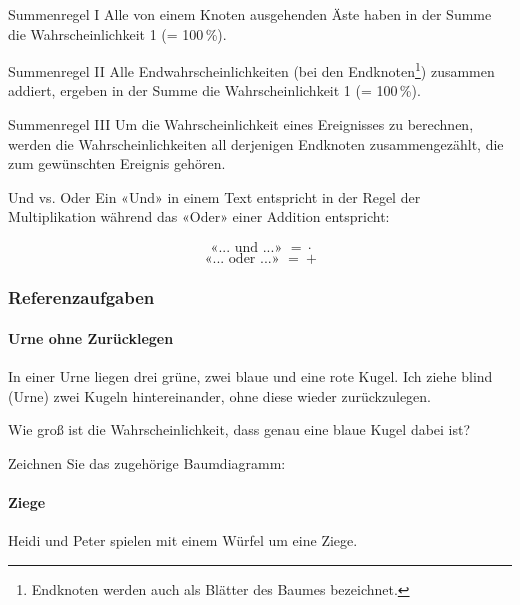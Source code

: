 \leserluft\leserluft
\begin{gesetz}{Summenregel I}{}
Alle von einem Knoten ausgehenden Äste haben in der Summe die Wahrscheinlichkeit 1 (= 100\,\%).
\end{gesetz}

\begin{gesetz}{Summenregel II}{}
Alle Endwahrscheinlichkeiten (bei den Endknoten\footnote{Endknoten werden auch als Blätter des Baumes bezeichnet.}) zusammen addiert, ergeben in der Summe die Wahrscheinlichkeit 1 (= 100\,\%).
\end{gesetz}

\begin{gesetz}{Summenregel III}{}
  Um die Wahrscheinlichkeit eines Ereignisses zu berechnen, werden die
  Wahrscheinlichkeiten all derjenigen Endknoten zusammengezählt, die zum gewünschten Ereignis gehören.
\end{gesetz}


\begin{bemerkung}{Und vs. Oder}{}
  Ein «Und» in einem Text entspricht in der Regel der Multiplikation
  während das «Oder» einer Addition entspricht:

  $$\text{ «... und ...» } \stackrel{{}^{}}{=}  \cdot{}$$
  $$\text{ «... oder ...» } \stackrel{{}^{}}{=}  +$$
\end{bemerkung}
\newpage


\subsubsection{Referenzaufgaben}

\paragraph{Urne ohne Zurücklegen} In einer Urne liegen drei grüne, zwei blaue und eine rote Kugel. Ich ziehe blind (Urne) zwei Kugeln hintereinander, ohne diese wieder zurückzulegen.

Wie groß ist die Wahrscheinlichkeit, dass genau eine blaue Kugel dabei ist?

Zeichnen Sie das zugehörige Baumdiagramm:


\paragraph{Ziege} Heidi und Peter spielen mit einem Würfel um eine Ziege.

